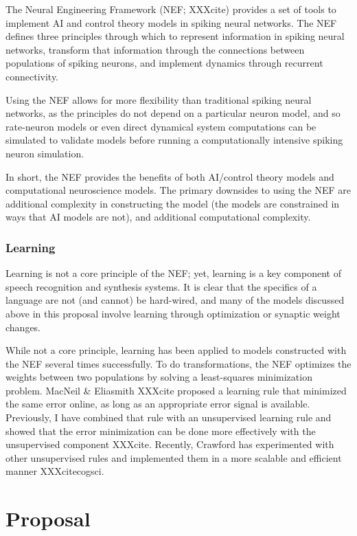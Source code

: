 \documentclass{article}
\begin{document}
The Neural Engineering Framework (NEF; XXXcite)
provides a set of tools to implement
AI and control theory models
in spiking neural networks.
The NEF defines three principles
through which to represent
information in spiking neural networks,
transform that information through the connections
between populations of spiking neurons,
and implement dynamics through
recurrent connectivity.

Using the NEF allows for more flexibility
than traditional spiking neural networks,
as the principles do not depend
on a particular neuron model,
and so rate-neuron models or even direct
dynamical system computations
can be simulated to validate models
before running a computationally intensive
spiking neuron simulation.

In short, the NEF provides
the benefits of both AI/control theory models
and computational neuroscience models.
The primary downsides to using the NEF
are additional complexity
in constructing the model
(the models are constrained in ways
that AI models are not),
and additional computational complexity.

\subsubsection{Learning}

Learning is not a core principle of the NEF;
yet, learning is a key component
of speech recognition and synthesis systems.
It is clear that the specifics
of a language are not (and cannot)
be hard-wired,
and many of the models
discussed above in this proposal
involve learning through
optimization or synaptic weight changes.

While not a core principle,
learning has been applied to models constructed
with the NEF several times successfully.
To do transformations, the NEF
optimizes the weights between two populations
by solving a least-squares minimization problem.
MacNeil \& Eliasmith XXXcite proposed
a learning rule that minimized the same
error online, as long as an appropriate
error signal is available.
Previously, I have combined that rule
with an unsupervised learning rule
and showed that the error minimization
can be done more effectively with
the unsupervised component
XXXcite.
Recently, Crawford has experimented
with other unsupervised rules
and implemented them
in a more scalable and efficient manner
XXXcitecogsci.

\section{Proposal}
\end{document}
